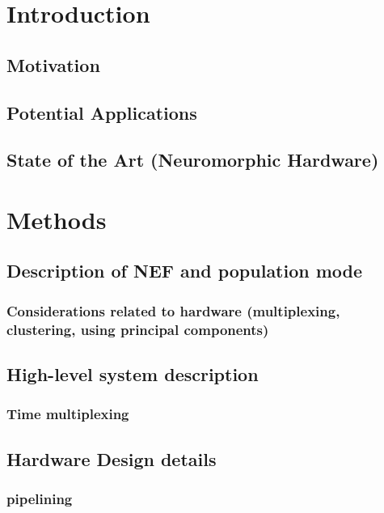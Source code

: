 \documentclass[english]{article}
\begin{document}
\section{Introduction}

\subsection{Motivation}

\subsection{Potential Applications}

\subsection{State of the Art (Neuromorphic Hardware)}

\section{Methods}

\subsection{Description of NEF and population mode}

\subsubsection{Considerations related to hardware (multiplexing, clustering, using principal components)}

\subsection{High-level system description}


\subsubsection{Time multiplexing}

\subsection{Hardware Design details}

\subsubsection{pipelining}
\end{document}
